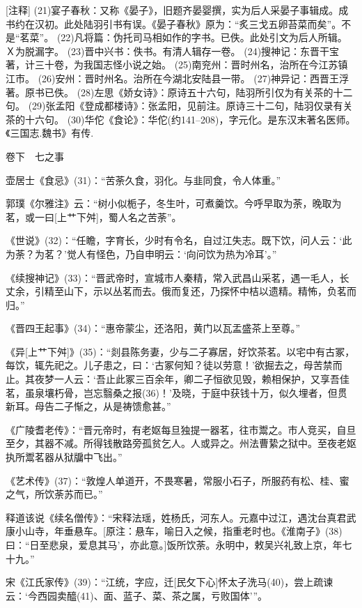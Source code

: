 \documentclass[12pt,UTF8]{ctexbook}
\begin{document}
[注释]
(21)宴子春秋：又称《晏子》，旧题齐晏婴撰，实为后人采晏子事辑成。成书约在汉初。此处陆羽引书有误。《晏子春秋》原为：“炙三戈五卵苔菜而矣”。不是“茗菜”。
(22)凡将篇：伪托司马相如作的字书。已佚。此处引文为后人所辑。Ｘ为脱漏字。
(23)晋中兴书：佚书。有清人辑存一卷。
(24)搜神记：东晋干宝著，计三十卷，为我国志怪小说之始。
(25)南兖州：晋时州名，治所在今江苏镇江市。
(26)安州：晋时州名。治所在今湖北安陆县一带。
(27)神异记：西晋王浮著。原书已佚。
(28)左思《娇女诗》：原诗五十六句，陆羽所引仅为有关茶的十二句。
(29)张孟阳《登成都楼诗》：张孟阳，见前注。原诗三十二句，陆羽仅录有关茶的十六句。
(30)华佗《食论》：华佗(约141--208)，字元化。是东汉末著名医师。《三国志.魏书》有传.

卷下　七之事

壶居士《食忌》(31)：“苦荼久食，羽化。与韭同食，令人体重。”

郭璞《尔雅注》云：“树小似栀子，冬生叶，可煮羹饮。今呼早取为荼，晚取为茗，或一曰[上艹下舛]，蜀人名之苦荼”。

《世说》(32)：“任瞻，字育长，少时有令名，自过江失志。既下饮，问人云：‘此为荼？为茗？’觉人有怪色，乃自申明云：‘向问饮为热为冷耳’。”

《续搜神记》(33)：“晋武帝时，宣城市人秦精，常入武昌山采茗，遇一毛人，长丈余，引精至山下，示以丛茗而去。俄而复还，乃探怀中桔以遗精。精怖，负茗而归。”

《晋四王起事》(34)：“惠帝蒙尘，还洛阳，黄门以瓦盂盛茶上至尊。”

《异[上艹下舛]》(35)：“剡县陈务妻，少与二子寡居，好饮茶茗。以宅中有古冢，每饮，辄先祀之。儿子患之，曰：‘古冢何知？徒以劳意！’欲掘去之，母苦禁而止。其夜梦一人云：‘吾止此冢三百余年，卿二子恒欲见毁，赖相保护，又享吾佳茗，虽泉壤朽骨，岂忘翳桑之报(36)！’及晓，于庭中获钱十万，似久埋者，但贯新耳。母告二子惭之，从是祷馈愈甚。”

《广陵耆老传》：“晋元帝时，有老妪每旦独提一器茗，往市鬻之。市人竞买，自旦至夕，其器不减。所得钱散路旁孤贫乞人。人或异之。州法曹絷之狱中。至夜老妪执所鬻茗器从狱牖中飞出。”

《艺术传》(37)：“敦煌人单道开，不畏寒暑，常服小石子，所服药有松、桂、蜜之气，所饮荼苏而已。”

释道该说《续名僧传》：“宋释法瑶，姓杨氏，河东人。元嘉中过江，遇沈台真君武康小山寺，年垂悬车。[原注：悬车，喻日入之候，指重老时也。《淮南子》(38)曰：“日至悲泉，爱息其马’，亦此意。]饭所饮荼。永明中，敕吴兴礼致上京，年七十九。”

宋《江氏家传》(39)：“江统，字应，迁[民攵下心]怀太子洗马(40)，尝上疏谏云：‘今西园卖醯(41)、面、蓝子、菜、茶之属，亏败国体’”。
\end{document}
